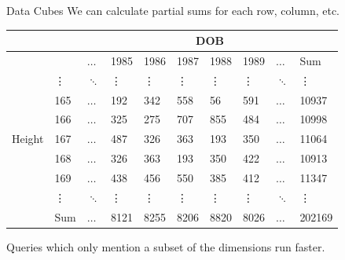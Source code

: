 \documentclass{beamer}
\theoremstyle{definition}
\theoremstyle{definition}
\begin{document}
\begin{frame}{Data Cubes}
    We can calculate partial sums for each row, column, etc.\cite{Gray96}
    \begin{table}[h]\footnotesize
        \begin{tabular} { | l | l | l | l | l | l | l | l | l | l |}
        \hline
        & & \multicolumn{8}{|c|}{DOB} \\ \hline
        & & $\hdots$ & 1985 & 1986 & 1987 & 1988 & 1989 & $\hdots$ & Sum \\ \hline
        \multirow{7}{*}{Height}
        & \vdots & $\ddots$ & \vdots & \vdots & \vdots & \vdots & \vdots & $\ddots$ & \vdots \\
        & 165 & $\hdots$ & 192 & 342 & 558 & 56 & 591 & $\hdots$ & 10937 \\
        & 166 & $\hdots$ & 325 & 275 & 707 & 855 & 484 & $\hdots$ & 10998 \\
        & 167 & $\hdots$ & 487 & 326 & 363 & 193 & 350 & $\hdots$ & 11064 \\
        & 168 & $\hdots$ & 326 & 363 & 193 & 350 & 422 & $\hdots$ & 10913 \\
        & 169 & $\hdots$ & 438 & 456 & 550 & 385 & 412 & $\hdots$ & 11347 \\
        & \vdots & $\ddots$ & \vdots & \vdots & \vdots & \vdots & \vdots & $\ddots$ & \vdots \\
        & Sum & $\hdots$ & 8121 & 8255 & 8206 & 8820 & 8026 & $\hdots$ & 202169 \\
        \hline
        \end{tabular}
    \end{table}
    \pause
    Queries which only mention a subset of the dimensions run faster.
\end{frame}
\end{document}
